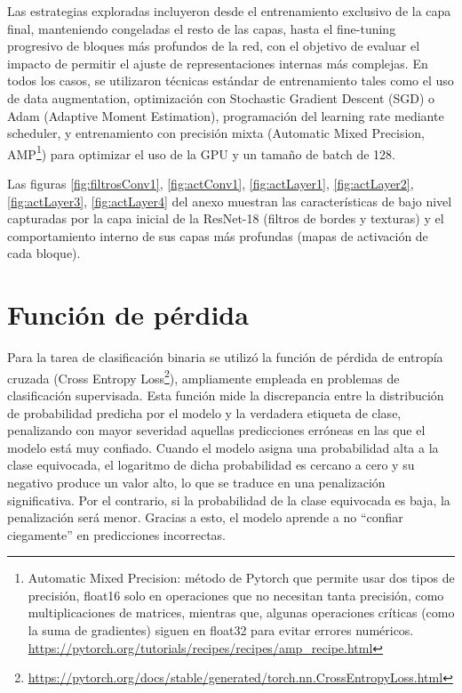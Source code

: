 Las estrategias exploradas incluyeron desde el entrenamiento exclusivo de la capa final, manteniendo congeladas el resto de las capas, hasta el fine-tuning progresivo de bloques más profundos de la red, con el objetivo de evaluar el impacto de permitir el ajuste de representaciones internas más complejas. En todos los casos, se utilizaron técnicas estándar de entrenamiento tales como el uso de data augmentation, optimización con Stochastic Gradient Descent (SGD) o Adam (Adaptive Moment Estimation), programación del learning rate mediante scheduler, y entrenamiento con precisión mixta (Automatic Mixed Precision, AMP\footnote{Automatic Mixed Precision: método de Pytorch que permite usar dos tipos de precisión, float16 solo en operaciones que no necesitan tanta precisión, como multiplicaciones de matrices, mientras que,
	algunas operaciones críticas (como la suma de gradientes) siguen en float32 para evitar errores numéricos. \url{https://pytorch.org/tutorials/recipes/recipes/amp_recipe.html}}) para optimizar el uso de la GPU y un tamaño de batch de 128.
	
Las figuras \ref{fig:filtrosConv1}, \ref{fig:actConv1}, \ref{fig:actLayer1}, \ref{fig:actLayer2}, \ref{fig:actLayer3}, \ref{fig:actLayer4} del anexo muestran las características de bajo nivel capturadas por la capa inicial de la ResNet-18 (filtros de bordes y texturas) y el comportamiento interno de sus capas más profundas (mapas de activación de cada bloque).

\section{Función de pérdida}
Para la tarea de clasificación binaria se utilizó la función de pérdida de entropía cruzada (Cross Entropy Loss\footnote{\url{https://pytorch.org/docs/stable/generated/torch.nn.CrossEntropyLoss.html}}), ampliamente empleada en problemas de clasificación supervisada. Esta función mide la discrepancia entre la distribución de probabilidad predicha por el modelo y la verdadera etiqueta de clase, penalizando con mayor severidad aquellas predicciones erróneas en las que el modelo está muy confiado. Cuando el modelo asigna una probabilidad alta a la clase equivocada, el logaritmo de dicha probabilidad es cercano a cero y su negativo produce un valor alto, lo que se traduce en una penalización significativa. Por el contrario, si la probabilidad de la clase equivocada es baja, la penalización será menor. Gracias a esto, el modelo aprende a no “confiar ciegamente” en predicciones incorrectas.

